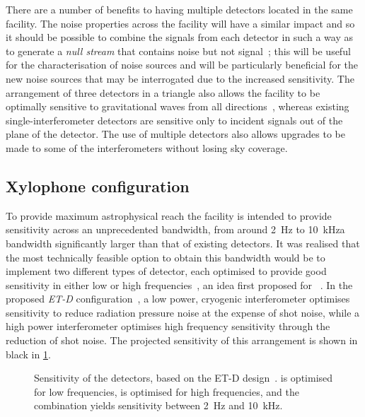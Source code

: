 There are a number of benefits to having multiple detectors located in the same facility. The noise properties across the facility will have a similar impact and so it should be possible to combine the signals from each detector in such a way as to generate a \emph{null stream} that contains noise but not signal~\cite{Hewitson2005, Ajith2006}; this will be useful for the characterisation of noise sources and will be particularly beneficial for the new noise sources that may be interrogated due to the increased sensitivity. The arrangement of three detectors in a triangle also allows the facility to be optimally sensitive to gravitational waves from all directions~\cite{Winkler1985}, whereas existing single-interferometer detectors are sensitive only to incident signals out of the plane of the detector. The use of multiple detectors also allows upgrades to be made to some of the interferometers without losing sky coverage.

\subsection{Xylophone configuration}
To provide maximum astrophysical reach the facility is intended to provide sensitivity across an unprecedented bandwidth, from around \SI{2}{\hertz} to \SI{10}{\kilo\hertz}\textemdash a bandwidth significantly larger than that of existing detectors. It was realised that the most technically feasible option to obtain this bandwidth would be to implement two different types of detector, each optimised to provide good sensitivity in either low or high frequencies~\cite{Hild2010}, an idea first proposed for \ALIGO{}~\cite{Conforto2004}. In the proposed \emph{ET-D} configuration~\cite{Hild2011}, a low power, cryogenic interferometer optimises sensitivity to reduce radiation pressure noise at the expense of shot noise, while a high power interferometer optimises high frequency sensitivity through the reduction of shot noise. The projected sensitivity of this arrangement is shown in black in \cref{fig:et-d-sensitivity}.

\begin{figure}
  \centering
  
  \caption[Sensitivity curves for the Einstein Telescope]{\label{fig:et-d-sensitivity}Sensitivity of the \ET{} detectors, based on the ET-D design~\cite{Hild2011}. \ETLF{} is optimised for low frequencies, \ETHF{} is optimised for high frequencies, and the combination yields sensitivity between \SI{2}{\hertz} and \SI{10}{\kilo\hertz}.}
\end{figure}

